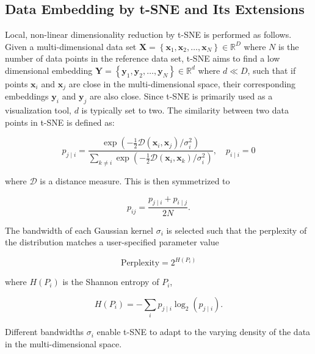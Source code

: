 \documentclass[runningheads]{llncs}
\begin{document}
\subsection{Data Embedding by t-SNE and Its Extensions\label{sec:tsne}}

Local, non-linear dimensionality reduction by t-SNE is performed as follows.
Given a multi-dimensional data set $\mathbf{X} = \left \{ \mathbf{x}_1,
\mathbf{x}_2, \dots, \mathbf{x}_N \right \} \in \mathbb{R}^D$ where $N$ is the
number of data points in the reference data set, t-SNE aims to find a low
dimensional embedding $\mathbf{Y} = \left \{ \mathbf{y}_1, \mathbf{y}_2, \dots,
\mathbf{y}_N \right \} \in \mathbb{R}^d$ where $d \ll D$, such that if points
$\mathbf{x}_i$ and $\mathbf{x}_j$ are close in the multi-dimensional space,
their corresponding embeddings $\mathbf{y}_i$ and $\mathbf{y}_j$ are also
close. Since t-SNE is primarily used as a visualization tool, $d$ is typically
set to two. The similarity between two data points in t-SNE is defined as:

\begin{equation}
p_{j \mid i} = \frac{\exp \left ( -\frac{1}{2} \mathcal{D}(\mathbf{x}_i, \mathbf{x}_j ) / \sigma_i^2 \right )}
{\sum_{k \neq i } \exp \left ( -\frac{1}{2} \mathcal{D}(\mathbf{x}_i, \mathbf{x}_k ) / \sigma_i^2 \right )}, \quad p_{i \mid i} = 0
\label{eq:gaussian_kernel}
\end{equation}

\noindent where $\mathcal{D}$ is a distance measure. This is then symmetrized to

\begin{equation}
p_{ij} = \frac{p_{j \mid i} + p_{i \mid j}}{2N}.
\label{eq:symmetrize}
\end{equation}

The bandwidth of each Gaussian kernel $\sigma_i$ is selected such that the
perplexity of the distribution matches a user-specified parameter value

\begin{equation}
\text{Perplexity} = 2^{H(P_i)}
\end{equation}

\noindent where $H(P_i)$ is the Shannon entropy of $P_i$,

\begin{equation}
H(P_i) = -\sum_i p_{j \mid i} \log_2 (p_{j \mid i}).
\end{equation}

\noindent Different bandwidths $\sigma_i$ enable t-SNE to adapt to the varying
density of the data in the multi-dimensional space.
\end{document}
